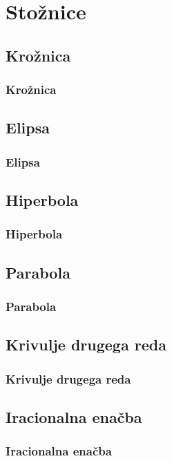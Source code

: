 \section{Stožnice}

\begin{frame}
    \sectionpage
\end{frame}

\begin{frame}
\end{frame}

    \subsection{Krožnica}

        \begin{frame}
            \frametitle{Krožnica}
        \end{frame}

    \subsection{Elipsa}

        \begin{frame}
            \frametitle{Elipsa}
        \end{frame}

    \subsection{Hiperbola}

        \begin{frame}
            \frametitle{Hiperbola}
        \end{frame}

    \subsection{Parabola}

        \begin{frame}
            \frametitle{Parabola}
        \end{frame}

    \subsection{Krivulje drugega reda}

        \begin{frame}
            \frametitle{Krivulje drugega reda}
        \end{frame}

    \subsection{Iracionalna enačba}

        \begin{frame}
            \frametitle{Iracionalna enačba}
        \end{frame}

